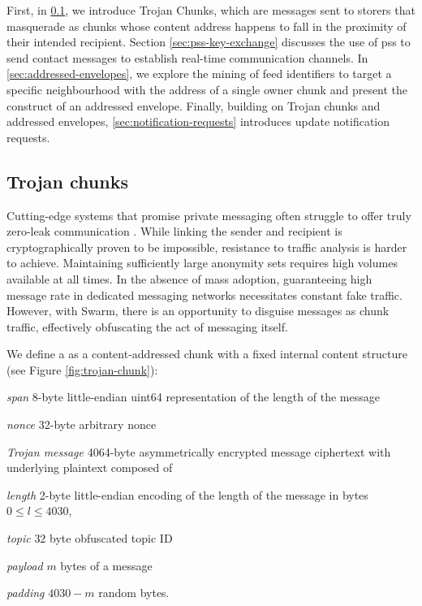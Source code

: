 First, in \ref{sec:trojan}, we introduce Trojan Chunks, which are messages sent to storers that masquerade as chunks whose content address happens to fall in the proximity of their intended recipient. 
Section \ref{sec:pss-key-exchange} discusses the use of pss to send contact messages to establish real-time communication channels.
In \ref{sec:addressed-envelopes}, we explore the mining of feed identifiers to target a specific neighbourhood with the address of a single owner chunk and present the construct of an addressed envelope. Finally, building on Trojan chunks and addressed envelopes, \ref{sec:notification-requests} introduces update notification requests.

\subsection{Trojan chunks\statusgreen}\label{sec:trojan}

Cutting-edge systems that promise private messaging often struggle to offer truly zero-leak communication \citep{kwon2016riffle}. While linking the sender and recipient is cryptographically proven to be impossible, resistance to traffic analysis is harder to achieve. Maintaining sufficiently large anonymity sets requires high volumes available at all times. In the absence of mass adoption, guaranteeing high message rate in dedicated messaging networks necessitates constant fake traffic. However, with Swarm, there is an opportunity to disguise messages as chunk traffic, effectively obfuscating the act of messaging itself. 

We define a  as a content-addressed chunk with a fixed internal content structure (see Figure \ref{fig:trojan-chunk}):

\begin{labelledlist}
    \item[\emph{span}] 8-byte little-endian uint64 representation of the length of the message  
    \item[\emph{nonce}] 32-byte arbitrary nonce 
    \item[\emph{Trojan message}] 4064-byte asymmetrically encrypted message ciphertext with underlying plaintext composed of
    \begin{labelledlist}
        \item[\emph{length}] 2-byte little-endian encoding of the length of the message in bytes $0\leq l\leq 4030$,
        \item[\emph{topic}] $32$ byte obfuscated topic ID   
        \item[\emph{payload}] $m$ bytes of a message 
        \item[\emph{padding}] $4030-m$ random bytes.
    \end{labelledlist}
\end{labelledlist}

